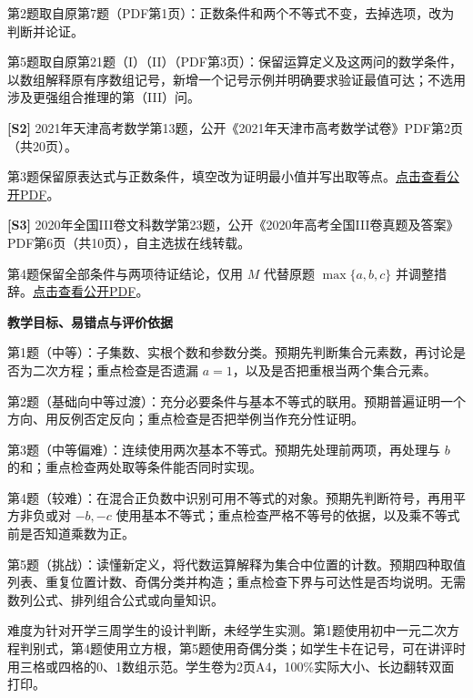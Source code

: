 \documentclass[UTF8,a4paper,11pt]{ctexart}
\begin{document}
第2题取自原第7题（PDF第1页）：正数条件和两个不等式不变，去掉选项，改为判断并论证。

第5题取自原第21题（I）（II）（PDF第3页）：保留运算定义及这两问的数学条件，以数组解释原有序数组记号，新增一个记号示例并明确要求验证最值可达；不选用涉及更强组合推理的第（III）问。

\textbf{[S2]} 2021年天津高考数学第13题，公开《2021年天津市高考数学试卷》PDF第2页（共20页）。

第3题保留原表达式与正数条件，填空改为证明最小值并写出取等点。\href{https://17094505.s21i.faiusr.com/61/ABUIABA9GAAg2bzahwYovJaMRQ.pdf}{点击查看公开PDF}。

\textbf{[S3]} 2020年全国III卷文科数学第23题，公开《2020年高考全国III卷真题及答案》PDF第6页（共10页），自主选拔在线转载。

第4题保留全部条件与两项待证结论，仅用 $M$ 代替原题 $\max\{a,b,c\}$ 并调整措辞。\href{https://cdn.zizzs.com/zixunzhan/202310/d89f23fd-c957-4f40-b6ef-86aa0eb869f0.pdf}{点击查看公开PDF}。

\textbf{教学目标、易错点与评价依据}

第1题（中等）：子集数、实根个数和参数分类。预期先判断集合元素数，再讨论是否为二次方程；重点检查是否遗漏 $a=1$，以及是否把重根当两个集合元素。

第2题（基础向中等过渡）：充分必要条件与基本不等式的联用。预期普遍证明一个方向、用反例否定反向；重点检查是否把举例当作充分性证明。

第3题（中等偏难）：连续使用两次基本不等式。预期先处理前两项，再处理与 $b$ 的和；重点检查两处取等条件能否同时实现。

第4题（较难）：在混合正负数中识别可用不等式的对象。预期先判断符号，再用平方非负或对 $-b,-c$ 使用基本不等式；重点检查严格不等号的依据，以及乘不等式前是否知道乘数为正。

第5题（挑战）：读懂新定义，将代数运算解释为集合中位置的计数。预期四种取值列表、重复位置计数、奇偶分类并构造；重点检查下界与可达性是否均说明。无需数列公式、排列组合公式或向量知识。

难度为针对开学三周学生的设计判断，未经学生实测。第1题使用初中一元二次方程判别式，第4题使用立方根，第5题使用奇偶分类；如学生卡在记号，可在讲评时用三格或四格的0、1数组示范。学生卷为2页A4，100\%实际大小、长边翻转双面打印。
\end{document}
